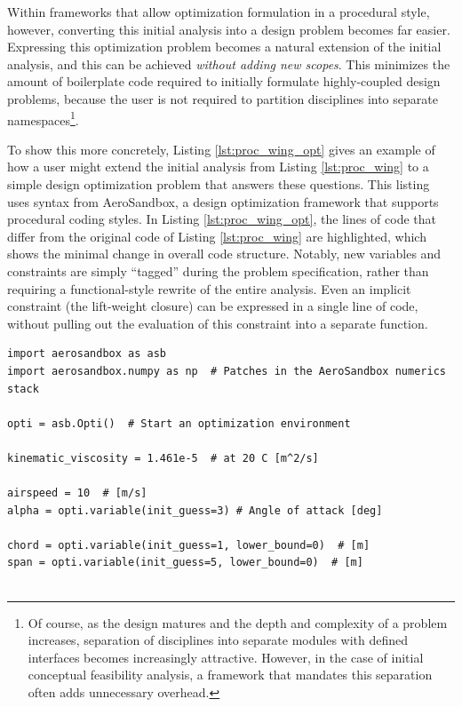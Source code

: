 \begin{enumerate}
    Within frameworks that allow optimization formulation in a procedural style, however, converting this initial analysis into a design problem becomes far easier. Expressing this optimization problem becomes a natural extension of the initial analysis, and this can be achieved \emph{without adding new scopes}. This minimizes the amount of boilerplate code required to initially formulate highly-coupled design problems, because the user is not required to partition disciplines into separate namespaces\footnote{Of course, as the design matures and the depth and complexity of a problem increases, separation of disciplines into separate modules with defined interfaces becomes increasingly attractive. However, in the case of initial conceptual feasibility analysis, a framework that mandates this separation often adds unnecessary overhead.}.

    To show this more concretely, Listing \ref{lst:proc_wing_opt} gives an example of how a user might extend the initial analysis from Listing \ref{lst:proc_wing} to a simple design optimization problem that answers these questions. This listing uses syntax from AeroSandbox, a design optimization framework that supports procedural coding styles. In Listing \ref{lst:proc_wing_opt}, the lines of code that differ from the original code of Listing \ref{lst:proc_wing} are highlighted, which shows the minimal change in overall code structure. Notably, new variables and constraints are simply ``tagged'' during the problem specification, rather than requiring a functional-style rewrite of the entire analysis. Even an implicit constraint (the lift-weight closure) can be expressed in a single line of code, without pulling out the evaluation of this constraint into a separate function.

    \begin{listing}[H]
        \begin{verbatim}
import aerosandbox as asb
import aerosandbox.numpy as np  # Patches in the AeroSandbox numerics stack

opti = asb.Opti()  # Start an optimization environment

kinematic_viscosity = 1.461e-5  # at 20 C [m^2/s]

airspeed = 10  # [m/s]
alpha = opti.variable(init_guess=3) # Angle of attack [deg]

chord = opti.variable(init_guess=1, lower_bound=0)  # [m]
span = opti.variable(init_guess=5, lower_bound=0)  # [m]


\end{verbatim}
\end{listing}
\end{enumerate}
